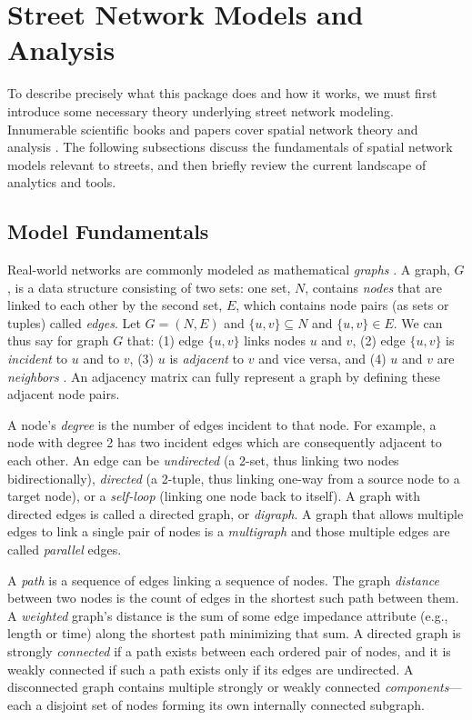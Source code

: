 \documentclass[12pt,letterpaper]{article} %
\begin{document}
\section{Street Network Models and Analysis}

To describe precisely what this package does and how it works, we must first introduce some necessary theory underlying street network modeling. Innumerable scientific books and papers cover spatial network theory and analysis \citep[e.g.,][]{tinkler_graph_1979,barnes_graph_1983,gastner_spatial_2006,barthelemy_spatial_2011,ducruet_spatial_2014,fischer_spatial_2014,marshall_street_2018}. The following subsections discuss the fundamentals of spatial network models relevant to streets, and then briefly review the current landscape of analytics and tools.

\subsection{Model Fundamentals}

Real-world networks are commonly modeled as mathematical \textit{graphs} \citep{trudeau_introduction_1994, barthelemy_spatial_2022}. A graph, $G$, is a data structure consisting of two sets: one set, $N$, contains \textit{nodes} that are linked to each other by the second set, $E$, which contains node pairs (as sets or tuples) called \textit{edges}. Let $G = (N, E)$ and $\{u, v\} \subseteq N$ and $\{u, v\} \in E$. We can thus say for graph $G$ that: (1) edge $\{u, v\}$ links nodes $u$ and $v$, (2) edge $\{u, v\}$ is \textit{incident} to $u$ and to $v$, (3) $u$ is \textit{adjacent} to $v$ and vice versa, and (4) $u$ and $v$ are \textit{neighbors} \citep{newman_networks:_2010}. An adjacency matrix can fully represent a graph by defining these adjacent node pairs.

A node's \textit{degree} is the number of edges incident to that node. For example, a node with degree 2 has two incident edges which are consequently adjacent to each other. An edge can be \textit{undirected} (a 2-set, thus linking two nodes bidirectionally), \textit{directed} (a 2-tuple, thus linking one-way from a source node to a target node), or a \textit{self-loop} (linking one node back to itself). A graph with directed edges is called a directed graph, or \textit{digraph}. A graph that allows multiple edges to link a single pair of nodes is a \textit{multigraph} and those multiple edges are called \textit{parallel} edges.

A \textit{path} is a sequence of edges linking a sequence of nodes. The graph \textit{distance} between two nodes is the count of edges in the shortest such path between them. A \textit{weighted} graph's distance is the sum of some edge impedance attribute (e.g., length or time) along the shortest path minimizing that sum. A directed graph is strongly \textit{connected} if a path exists between each ordered pair of nodes, and it is weakly connected if such a path exists only if its edges are undirected. A disconnected graph contains multiple strongly or weakly connected \textit{components}---each a disjoint set of nodes forming its own internally connected subgraph.
\end{document}
